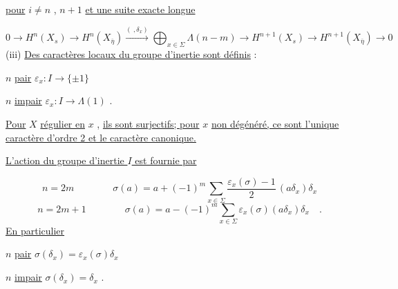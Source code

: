 \underline{pour} $i \neq n$ , $n+1$ \underline{et une suite exacte longue} 



\begin{equation*}
 0 \longrightarrow H^n(X_s) \longrightarrow H^n(X_{\overline{\eta}}) \overset{(\ , \delta_x)}{\longrightarrow} \bigoplus_{x \in \Sigma} \Lambda(n-m) \longrightarrow H^{n+1}(X_s) \longrightarrow H^{n+1}(X_{\overline{\eta}}) \longrightarrow 0
\end{equation*}
(iii) \underline{Des caractères locaux du groupe d'inertie sont définis} :

$n$ \quad \underline{pair} \qquad $\varepsilon_x : I \longrightarrow \{\pm 1\}$

$n$ \quad \underline{impair} \qquad $\varepsilon_x : I \longrightarrow \Lambda(1)$ .

\underline{Pour} $X$ \underline{régulier en} $x$ , \underline{ils sont surjectifs; pour} $x$ \underline{non dégénéré, ce sont l'unique caractère d'ordre 2 et le caractère canonique.}

\underline{L'action du groupe d'inertie $I$ est fournie par}

\begin{equation*}
n = 2m \qquad\qquad \sigma(a) = a + (-1)^m \sum_{x \in \Sigma} \frac{\varepsilon_x(\sigma)-1}{2}\, (a\delta_x)\delta_x
\end{equation*}
\begin{equation*}
n = 2m + 1 \qquad\qquad \sigma(a) = a - (-1)^m \sum_{x \in \Sigma} \varepsilon_x(\sigma)(a\delta_x)\delta_x \quad .
\end{equation*}
\underline{En particulier}

$n$ \quad \underline{pair} \qquad $\sigma(\delta_x) = \varepsilon_x(\sigma)\delta_x$

$n$ \quad \underline{impair} \qquad $\sigma(\delta_x) = \delta_x$ .
